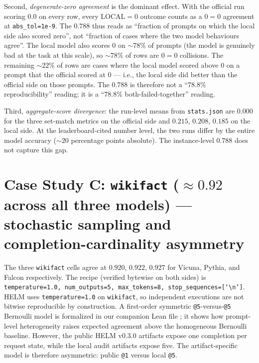 \documentclass[11pt]{article}
\begin{document}
Second, \emph{degenerate-zero agreement} is the dominant effect.
With the official run scoring $0.0$ on every row, every $\text{LOCAL}=0$
  outcome counts as a $0=0$ agreement at \texttt{abs\_tol=1e-9}.
The $0.788$ thus reads as ``fraction of prompts on which the local
  side also scored zero'', not ``fraction of cases where the two model
  behaviours agree''.
The local model also scores $0$ on $\sim 78\%$ of prompts (the model
  is genuinely bad at the task at this scale), so $\sim 78\%$ of
  rows are $0=0$ collisions.
The remaining $\sim 22\%$ of rows are cases where the local model
  scored above $0$ on a prompt that the official scored at $0$ ---
  i.e., the local side did better than the official side on those
  prompts.
The $0.788$ is therefore not a ``$78.8\%$ reproducibility'' reading;
  it is a ``$78.8\%$ both-failed-together'' reading.

Third, \emph{aggregate-score divergence}: the run-level means from
  \texttt{stats.json} are $0.000$ for the three set-match metrics
  on the official side and $0.215$, $0.208$, $0.185$ on the local
  side.
At the leaderboard-cited number level, the two runs differ by the
  entire model accuracy ($\sim 20$ percentage points absolute).
The instance-level $0.788$ does not capture this gap.


\section{Case Study C: \texorpdfstring{\texttt{wikifact} ($\approx 0.92$ across all three models)}{wikifact (approx 0.92 across all three models)} --- stochastic sampling and completion-cardinality asymmetry}\label{sec:tr-case-c}

The three \texttt{wikifact} cells agree at $0.920$, $0.922$, $0.927$
  for Vicuna, Pythia, and Falcon respectively.
The recipe (verified bytewise on both sides) is
  \texttt{temperature=1.0, num\_outputs=5, max\_tokens=8,
  stop\_sequences=[`\textbackslash n']}.
HELM uses \texttt{temperature=1.0} on \texttt{wikifact}, so independent
  executions are not bitwise reproducible by construction.
A first-order symmetric \texttt{@5}-versus-\texttt{@5} Bernoulli model
  is formalized in our companion Lean file
  ; it shows how prompt-level
  heterogeneity raises expected agreement above the homogeneous
  Bernoulli baseline.
However, the public HELM v0.3.0 artifacts expose one completion per
  request state, while the local audit artifacts expose five.  The
  artifact-specific model is therefore asymmetric: public \texttt{@1}
  versus local \texttt{@5}.
\end{document}
